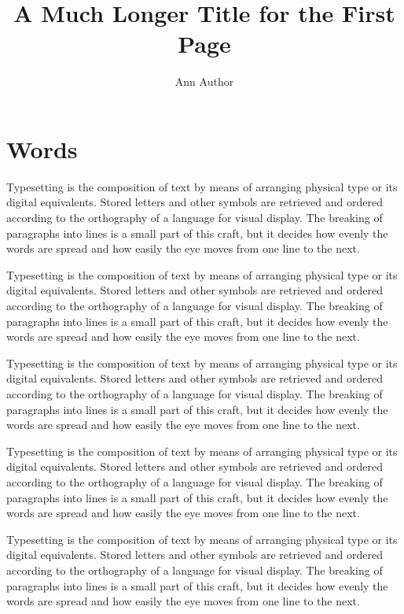 \documentclass{amsart}
\begin{document}
\title[Short Title]{A Much Longer Title for the First Page}
\author[A. Author]{Ann Author}
\thispagestyle{empty}
\maketitle
\section{Words}
Typesetting is the composition of text by means of arranging physical type or its digital equivalents. Stored letters and other symbols are retrieved and ordered according to the orthography of a language for visual display. The breaking of paragraphs into lines is a small part of this craft, but it decides how evenly the words are spread and how easily the eye moves from one line to the next.

Typesetting is the composition of text by means of arranging physical type or its digital equivalents. Stored letters and other symbols are retrieved and ordered according to the orthography of a language for visual display. The breaking of paragraphs into lines is a small part of this craft, but it decides how evenly the words are spread and how easily the eye moves from one line to the next.

Typesetting is the composition of text by means of arranging physical type or its digital equivalents. Stored letters and other symbols are retrieved and ordered according to the orthography of a language for visual display. The breaking of paragraphs into lines is a small part of this craft, but it decides how evenly the words are spread and how easily the eye moves from one line to the next.

Typesetting is the composition of text by means of arranging physical type or its digital equivalents. Stored letters and other symbols are retrieved and ordered according to the orthography of a language for visual display. The breaking of paragraphs into lines is a small part of this craft, but it decides how evenly the words are spread and how easily the eye moves from one line to the next.

Typesetting is the composition of text by means of arranging physical type or its digital equivalents. Stored letters and other symbols are retrieved and ordered according to the orthography of a language for visual display. The breaking of paragraphs into lines is a small part of this craft, but it decides how evenly the words are spread and how easily the eye moves from one line to the next.
\end{document}
